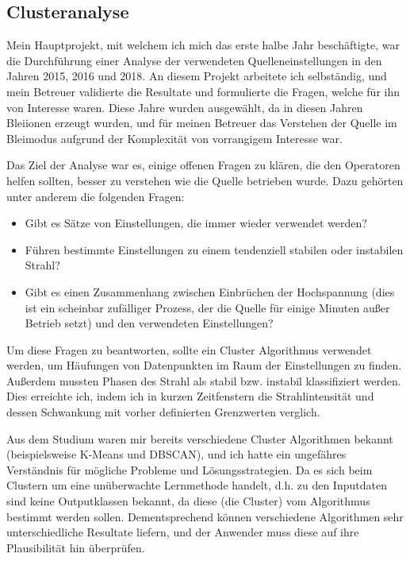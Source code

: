\documentclass[11pt, a4paper, titlepage, headings=standardclasses]{scrartcl}
\begin{document}
\subsection*{Clusteranalyse}

Mein Hauptprojekt, mit welchem ich mich das erste halbe Jahr beschäftigte, war die Durchführung einer Analyse der verwendeten Quelleneinstellungen in den Jahren 2015, 2016 und 2018. An diesem Projekt arbeitete ich selbständig, und mein Betreuer validierte die Resultate und formulierte die Fragen, welche für ihn von Interesse waren. Diese Jahre wurden ausgewählt, da in diesen Jahren Bleiionen erzeugt wurden, und für meinen Betreuer das Verstehen der Quelle im Bleimodus aufgrund der Komplexität von vorrangigem Interesse war.

Das Ziel der Analyse war es, einige offenen Fragen zu klären, die den Operatoren helfen sollten, besser zu verstehen wie die Quelle betrieben wurde. Dazu gehörten unter anderem die folgenden Fragen: 

\begin{itemize}
    \setlength\itemsep{-0.2cm}
    \item Gibt es Sätze von Einstellungen, die immer wieder verwendet werden?
    \item Führen bestimmte Einstellungen zu einem tendenziell stabilen oder instabilen Strahl?
    \item Gibt es einen Zusammenhang zwischen Einbrüchen der Hochspannung (dies ist ein scheinbar zufälliger Prozess, der die Quelle für einige Minuten außer Betrieb setzt) und den verwendeten Einstellungen?
\end{itemize}

Um diese Fragen zu beantworten, sollte ein Cluster Algorithmus verwendet werden, um Häufungen von Datenpunkten im Raum der Einstellungen zu finden. Außerdem mussten Phasen des Strahl als stabil bzw. instabil klassifiziert werden. Dies erreichte ich, indem ich in kurzen Zeitfenstern die Strahlintensität und dessen Schwankung mit vorher definierten Grenzwerten verglich.

Aus dem Studium waren mir bereits verschiedene Cluster Algorithmen bekannt (beispielsweise K-Means und DBSCAN), und ich hatte ein ungefähres Verständnis für mögliche Probleme und Lösungsstrategien. Da es sich beim Clustern um eine unüberwachte Lernmethode handelt, d.h. zu den Inputdaten sind keine Outputklassen bekannt, da diese (die Cluster) vom Algorithmus bestimmt werden sollen. Dementsprechend können verschiedene Algorithmen sehr unterschiedliche Resultate liefern, und der Anwender muss diese auf ihre Plausibilität hin überprüfen.
\end{document}
